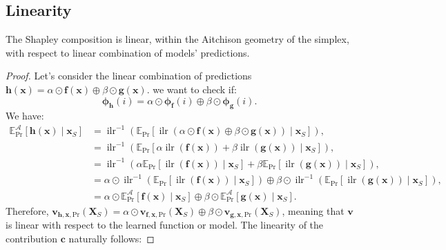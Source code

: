 \documentclass{article}
\theoremstyle{plain}
\theoremstyle{definition}
\theoremstyle{remark}
\DeclareMathOperator{\ilr}{ilr}
\begin{document}
\subsection{Linearity}

The Shapley composition is linear, within the Aitchison geometry of the simplex, with respect to linear combination of models' predictions.
\begin{proof}
  Let's consider the linear combination of predictions $\bm{h}(\bm{x}) = \alpha \odot \bm{f}(\bm{x}) \oplus \beta \odot \bm{g}(\bm{x})$. we want to check if:
  \begin{equation}
    \label{eq:linearsimplex}
    \bm{\phi}_{\bm{h}}(i) = \alpha \odot \bm{\phi}_{\bm{f}}(i) \oplus \beta\odot \bm{\phi}_{\bm{g}}(i).
  \end{equation}
  We have:
  \begin{equation}
    \begin{aligned}
      \mathbb{E}^{\mathcal{A}}_{\text{Pr}}[\bm{h}(\bm{x})\mid \bm{x}_S] &= \ilr^{-1} \left( \mathbb{E}_{\text{Pr}} [\ilr \left(  \alpha \odot \bm{f}(\bm{x}) \oplus \beta \odot \bm{g}(\bm{x}) \right) \mid \bm{x}_S] \right),\\
                                                                        &= \ilr^{-1} \left( \mathbb{E}_{\text{Pr}} [\alpha \ilr \left( \bm{f}(\bm{x})\right) + \beta \ilr \left( \bm{g}(\bm{x}) \right) \mid \bm{x}_S] \right),\\
                                                                        &= \ilr^{-1} \left( \alpha \mathbb{E}_{\text{Pr}} [ \ilr \left( \bm{f}(\bm{x})\right) \mid \bm{x}_S] + \beta \mathbb{E}_{\text{Pr}} [ \ilr \left( \bm{g}(\bm{x}) \right) \mid \bm{x}_S] \right),\\
                                                                        &= \alpha \odot \ilr^{-1} \left( \mathbb{E}_{\text{Pr}} [ \ilr \left( \bm{f}(\bm{x})\right) \mid \bm{x}_S] \right) \oplus \beta \odot \ilr^{-1} \left( \mathbb{E}_{\text{Pr}} [ \ilr \left( \bm{g}(\bm{x}) \right) \mid \bm{x}_S] \right),\\
                                                                        &= \alpha \odot \mathbb{E}^{\mathcal{A}}_{\text{Pr}}[\bm{f}(\bm{x})\mid \bm{x}_S] \oplus \beta \odot \mathbb{E}^{\mathcal{A}}_{\text{Pr}}[\bm{g}(\bm{x})\mid \bm{x}_S].
    \end{aligned}
  \end{equation}
  Therefore, $\bm{v}_{\bm{h},\bm{x},\text{Pr}}(\bm{X}_S) = \alpha \odot \bm{v}_{\bm{f},\bm{x},\text{Pr}}(\bm{X}_S) \oplus \beta \odot \bm{v}_{\bm{g},\bm{x},\text{Pr}}(\bm{X}_S)$, meaning that $\bm{v}$ is linear with respect to the learned function or model. The linearity of the contribution $\bm{c}$ naturally follows:

\end{proof}
\end{document}
